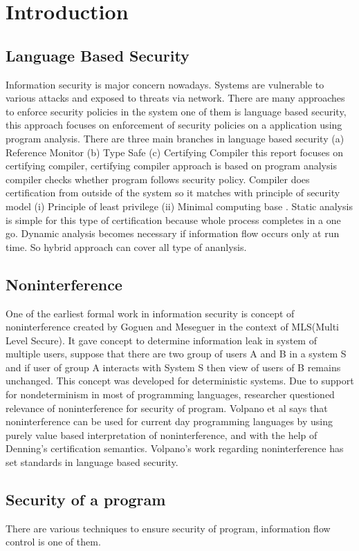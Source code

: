 \chapter{Introduction}
\section{Language Based Security}
Information security is major concern nowadays. Systems are vulnerable to various attacks and exposed to threats via network. There are many approaches to enforce security policies in the system one of them is language based security, this approach focuses on enforcement of security policies on a application using program analysis. There are three main branches in language based security (a) Reference Monitor (b) Type Safe (c) Certifying Compiler this report focuses on certifying compiler, certifying compiler approach is based on program analysis compiler checks whether program follows security policy. Compiler does certification from outside of the system so it matches with principle of security model (i) Principle of least privilege (ii) Minimal computing base \cite{lang}. Static analysis is simple for this type of certification because whole process completes in a one go. Dynamic analysis becomes necessary if information flow occurs only at run time. So hybrid approach can cover all type of ananlysis.    
\section{Noninterference}
One of the earliest formal work in information security is concept of noninterference created by Goguen and Meseguer \cite{noni} in the context of MLS(Multi Level Secure). It gave concept to determine information leak in system of multiple users, suppose that there are two group of users A and B in a system S and if user of group A interacts with System S then view of users of B remains unchanged. This concept was developed for deterministic systems. Due to support for nondeterminism in most of programming languages, researcher \cite{ques} questioned relevance of noninterference for security of program. 
Volpano et al \cite{volpano} says that noninterference can be used for current day programming languages by using purely value based interpretation of noninterference, and with the help of Denning's certification semantics. Volpano's work regarding noninterference has set standards in language based security.          
\section{Security of a program}
There are various techniques to ensure security of program, information flow control is one of them. 


